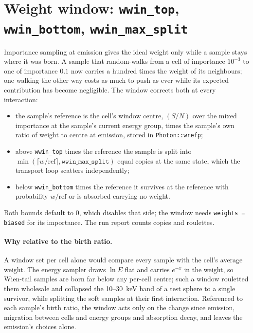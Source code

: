\documentclass[11pt]{article}
\newcommand{\key}[1]{\texttt{#1}}
\begin{document}
\section{Weight window: \key{wwin\_top}, \key{wwin\_bottom}, \key{wwin\_max\_split}}
\label{sec:window}

Importance sampling at emission gives the ideal weight only while a sample stays where it
was born. A sample that random-walks from a cell of importance $10^{-3}$ to one of
importance $0.1$ now carries a hundred times the weight of its neighbours; one walking
the other way costs as much to push as ever while its expected contribution has become
negligible. The window corrects both at every interaction:
\begin{itemize}
\item the sample's reference is the cell's window centre, $(S/N)$ over the mixed
  importance at the sample's current energy group, times the sample's own ratio of weight
  to centre at emission, stored in \key{Photon::wrefp};
\item above \key{wwin\_top} times the reference the sample is split into
  $\min(\lceil w/\mathrm{ref}\rceil, \key{wwin\_max\_split})$ equal copies at the same
  state, which the transport loop scatters independently;
\item below \key{wwin\_bottom} times the reference it survives at the reference with
  probability $w/\mathrm{ref}$ or is absorbed carrying no weight.
\end{itemize}
Both bounds default to 0, which disables that side; the window needs
\key{weights = biased} for its importance. The run report counts copies and roulettes.

\paragraph{Why relative to the birth ratio.} A window set per cell alone would compare
every sample with the cell's average weight. The energy sampler draws $\ln E$ flat and
carries $e^{-x}$ in the weight, so Wien-tail samples are born far below any per-cell
centre; such a window rouletted them wholesale and collapsed the 10--30~keV band of a
test sphere to a single survivor, while splitting the soft samples at their first
interaction. Referenced to each sample's birth ratio, the window acts only on the change
since emission, migration between cells and energy groups and absorption decay, and
leaves the emission's choices alone.
\end{document}
